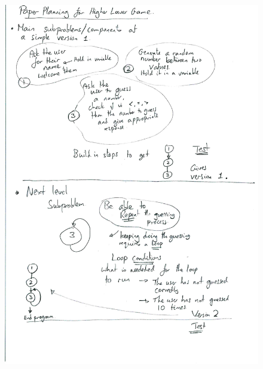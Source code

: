\documentclass[a4paper,12pt]{article}
\begin{document}
\newpage
\begin{figure} [!h]
	\centering
	\includegraphics[width=17cm]{iterative_processes/higherlowerplanning-1.pdf}
\end{figure}
\end{document}
